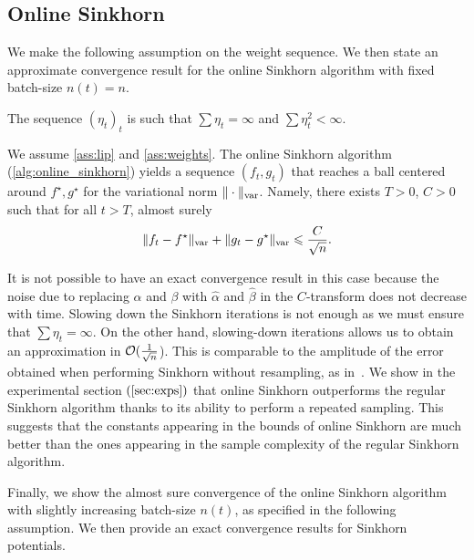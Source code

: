 \subsection{Online Sinkhorn}

We make the following \citet{robbins1951stochastic} assumption on the weight sequence. We then state an approximate convergence result for the online Sinkhorn algorithm with fixed batch-size $n(t) = n$.

\begin{assumption}\label{ass:weights}
    The sequence ${(\eta_t)}_t$ is such that
    $\sum \eta_t = \infty$ and $\sum \eta_t^2 < \infty$.
\end{assumption}

\begin{proposition}\label{prop:convergence_bis}
    We assume \autoref{ass:lip} and \ref{ass:weights}. The online Sinkhorn algorithm (\autoref{alg:online_sinkhorn}) yields a sequence $(f_t, g_t)$ that reaches a
    ball centered around $f^\star, g^\star$ for the variational norm $\Vert
    \cdot \Vert_{\text{\upshape var}}$.
     Namely, there exists $T > 0$, $C > 0$ such that for all $t > T$, almost surely
    \begin{equation}
        \Vert f_t - f^\star \Vert_{\text{\upshape var}}
        + \Vert g_t - g^\star \Vert_{\text{\upshape var}} 
        \leqslant \frac{C}{\sqrt{n}} .
    \end{equation}
\end{proposition}

It is not possible to have an exact convergence result in this case because the noise due
to replacing $\alpha$ and $\beta$ with $\hat \alpha$ and $\hat \beta$ in the
$C$-transform does not decrease with time. Slowing down the Sinkhorn
iterations is not enough as we must ensure that $\sum \eta_t = \infty$. On the
other hand, slowing-down iterations allows us to obtain an approximation in
$\mathcal{O}(\frac{1}{\sqrt{n}}$). This is comparable to the amplitude of the error obtained when
performing Sinkhorn without resampling, as in~\citep{2019-Genevay-aistats}.  We show in
the experimental section $(\autoref{sec:exps})$ that online Sinkhorn 
outperforms the regular Sinkhorn algorithm thanks to its ability to perform a repeated sampling. 
%
This suggests that the constants appearing in the bounds of online Sinkhorn are much
better than the ones appearing in the sample complexity of the regular Sinkhorn
algorithm.

Finally, we show the almost sure convergence of the online Sinkhorn algorithm
with slightly increasing batch-size $n(t)$, as specified in the following
assumption. We then provide an exact convergence results for Sinkhorn potentials.

